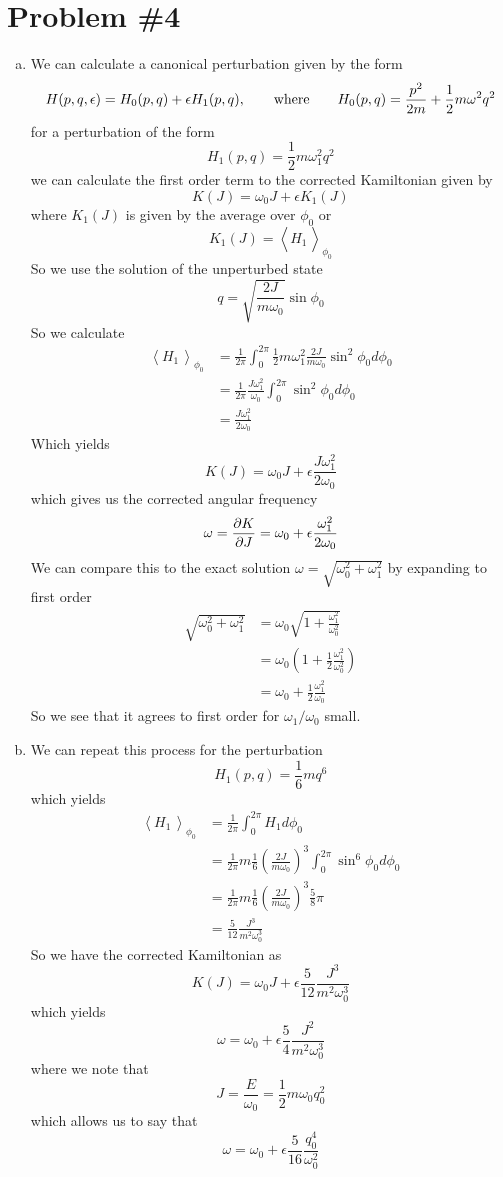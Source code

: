 \documentclass[11pt]{article}
\numberwithin{equation}{section}
\begin{document}
\section{Problem \#4}
\begin{enumerate}[(a)]
\item We can calculate a canonical perturbation given by the form
$$H(p,q,\epsilon) = H_0(p,q) + \epsilon H_1(p,q),\qquad \textnormal{where}\qquad H_0(p,q) = \frac{p^2}{2m}+\frac{1}{2}m\omega^2q^2$$
for a perturbation of the form
$$H_1(p,q) = \frac{1}{2}m\omega_1^2q^2$$
we can calculate the first order term to the corrected Kamiltonian given by
$$K(J) = \omega_0J + \epsilon K_1(J)$$
where $K_1(J)$ is given by the average over $\phi_0$ or
$$K_1(J) = \left\langle{H_1}\frac{}{}\right\rangle_{\phi_0}$$
So we use the solution of the unperturbed state
$$q=\sqrt{\frac{2J}{m\omega_0}}\sin\phi_0$$ 
So we calculate
\begin{align*}
\left\langle{H_1}\frac{}{}\right\rangle_{\phi_0} &= \frac{1}{2\pi}\int_{0}^{2\pi}\frac{1}{2}m\omega_1^2\frac{2J}{m\omega_0}\sin^2\phi_0d\phi_0\\
&= \frac{1}{2\pi}\frac{J\omega_1^2}{\omega_0}\int_{0}^{2\pi}\sin^2\phi_0d\phi_0\\
&= \frac{J\omega_1^2}{2\omega_0}
\end{align*}
Which yields
$$K(J) = \omega_0J + \epsilon \frac{J\omega_1^2}{2\omega_0}$$
which gives us the corrected angular frequency
$$\omega = \frac{\partial{K}}{\partial{J}} = \omega_0 + \epsilon\frac{\omega_1^2}{2\omega_0}$$
We can compare this to the exact solution $\omega = \sqrt{\omega_0^2+\omega_1^2}$ by
expanding to first order
\begin{align*}
\sqrt{\omega_0^2+\omega_1^2} &= \omega_0\sqrt{1+\frac{\omega_1^2}{\omega_0^2}}\\
&= \omega_0\left(1+\frac{1}{2}\frac{\omega_1^2}{\omega_0^2}\right)\\
&= \omega_0+\frac{1}{2}\frac{\omega_1^2}{\omega_0}
\end{align*}
So we see that it agrees to first order for $\omega_1/\omega_0$ small.

\item We can repeat this process for the perturbation
$$H_1(p,q) = \frac{1}{6}mq^6$$
which yields
\begin{align*}
\left\langle{H_1}\frac{}{}\right\rangle_{\phi_0} &= \frac{1}{2\pi}\int_{0}^{2\pi}H_1d\phi_0\\
&= \frac{1}{2\pi}m\frac{1}{6}\left(\frac{2J}{m\omega_0}\right)^{3}\int_{0}^{2\pi}\sin^6\phi_0d\phi_0\\
&= \frac{1}{2\pi}m\frac{1}{6}\left(\frac{2J}{m\omega_0}\right)^{3}\frac{5}{8}\pi\\
&= \frac{5}{12}\frac{J^3}{m^2\omega_0^3}
\end{align*}
So we have the corrected Kamiltonian as
$$K(J) = \omega_0J + \epsilon \frac{5}{12}\frac{J^3}{m^2\omega_0^3}$$
which yields
$$\omega = \omega_0 + \epsilon\frac{5}{4}\frac{J^2}{m^2\omega_0^3}$$
where we note that 
$$J = \frac{E}{\omega_0} = \frac{1}{2}m\omega_0q_0^2$$
which allows us to say that
$$\omega = \omega_0 + \epsilon\frac{5}{16}\frac{q_0^4}{\omega_0^2}$$


\end{enumerate}

\pagebreak
\end{document}
